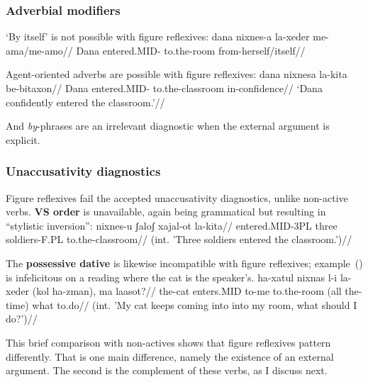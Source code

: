 		\subsubsection{Adverbial modifiers}
`By itself' is not possible with figure reflexives:
\ex \begingl
	\gla\ljudge{*}dana nixnes-a la-xeder me-a{\ts}ma/me-a{\ts}mo//
	\glb Dana entered.MID- to.the-room from-herself/itself//
	\endgl
\xe

Agent-oriented adverbs are possible with figure reflexives:
\ex\label{ex:vz:nixnesa}\begingl
	\gla dana nixnesa la-kita be-bitaxon//
	\glb Dana entered.MID- to.the-classroom in-confidence//
	\glft `Dana confidently entered the classroom.'//
	\endgl
\xe

And \emph{by}-phrases are an irrelevant diagnostic when the external argument is explicit.

		\subsubsection{Unaccusativity diagnostics}
Figure reflexives fail the accepted unaccusativity diagnostics, unlike non-active verbs. \textbf{VS order} is unavailable, again being grammatical but resulting in ``stylistic inversion'':
\ex \begingl
	\gla\ljudge{\#}nixnes-u ʃaloʃ xajal-ot la-kita//
	\glb entered.MID-3PL three soldiers-F.PL to.the-classroom//
	\glft (int. 'Three soldiers entered the classroom.')//
	\endgl
\xe

The \textbf{possessive dative} is likewise incompatible with figure reflexives; example~(\nextx) is infelicitous on a reading where the cat is the speaker's.
\ex \begingl
	\gla\ljudge{\#}ha-xatul nixnas l-i la-xeder (kol ha-zman), ma laasot?//
	\glb the-cat enters.MID to-me to.the-room (all the-time) what to.do//
	\glft (int. 'My cat keeps coming into into my room, what should I do?')//
	\endgl
\xe

This brief comparison with non-actives shows that figure reflexives pattern differently. That is one main difference, namely the existence of an external argument. The second is the complement of these verbs, as I discuss next.

